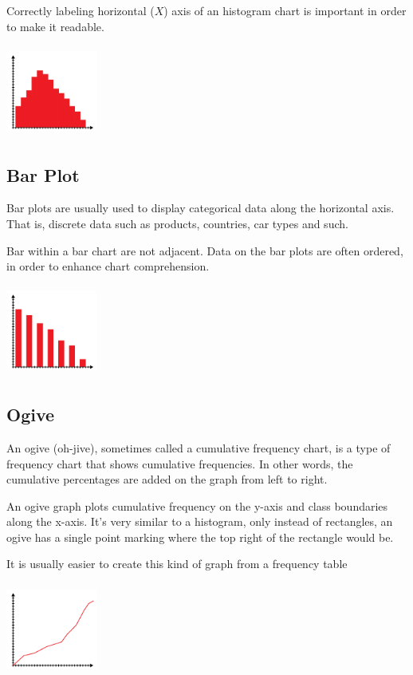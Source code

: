 \documentclass{article}
\begin{document}
Correctly labeling horizontal ($X$) axis of an histogram chart is important in order to make it readable.

\includegraphics[width=3cm, height=3cm]{histogram_chart}

\subsection{Bar Plot}
Bar plots are usually used to display categorical data along the horizontal axis. That is, discrete data such as products, countries, car types and such. 

Bar within a bar chart are not adjacent. Data on the bar plots are often ordered, in order to enhance chart comprehension. 

\includegraphics[width=3cm, height=3cm]{bar_chart}

\subsection{Ogive}
An ogive (oh-jive), sometimes called a cumulative frequency chart, is a type of frequency chart that shows cumulative frequencies. In other words, the cumulative percentages are added on the graph from left to right.

An ogive graph plots cumulative frequency on the y-axis and class boundaries along the x-axis. It’s very similar to a histogram, only instead of rectangles, an ogive has a single point marking where the top right of the rectangle would be. 

It is usually easier to create this kind of graph from a frequency table

\includegraphics[width=3cm, height=3cm]{ogive_chart}
\end{document}
